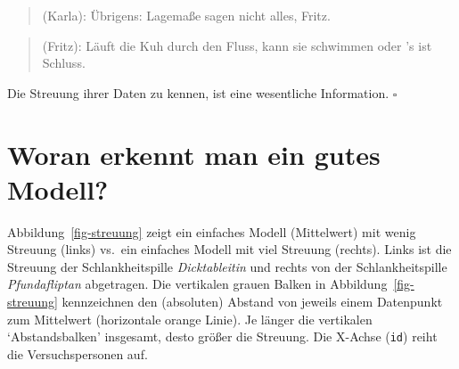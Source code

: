 \documentclass[
  letterpaper,
  twoside,
  open=any]{scrbook}
\theoremstyle{definition}
\theoremstyle{definition}
\theoremstyle{definition}
\theoremstyle{remark}
\begin{document}
\begin{quote}
{} (Karla): Übrigens: Lagemaße sagen nicht alles,
Fritz.
\end{quote}

\begin{quote}
{} (Fritz): Läuft die Kuh durch den Fluss, kann sie
schwimmen oder 's ist Schluss.
\end{quote}

\begin{tcolorbox}[enhanced jigsaw, colbacktitle=quarto-callout-important-color!10!white, colframe=quarto-callout-important-color-frame, coltitle=black, arc=.35mm, breakable, opacitybacktitle=0.6, toprule=.15mm, colback=white, rightrule=.15mm, opacityback=0, toptitle=1mm, title=\textcolor{quarto-callout-important-color}{\faExclamation}\hspace{0.5em}{Wichtig}, titlerule=0mm, bottomtitle=1mm, bottomrule=.15mm, leftrule=.75mm, left=2mm]

Die Streuung ihrer Daten zu kennen, ist eine wesentliche Information.
\(\square\)

\end{tcolorbox}

\section{Woran erkennt man ein gutes
Modell?}\label{woran-erkennt-man-ein-gutes-modell}

Abbildung~\ref{fig-streuung} zeigt ein einfaches Modell (Mittelwert) mit
wenig Streuung (links) vs.~ein einfaches Modell mit viel Streuung
(rechts). Links ist die Streuung der Schlankheitspille
\emph{Dicktableitin} und rechts von der Schlankheitspille
\emph{Pfundafliptan} abgetragen. Die vertikalen grauen Balken in
Abbildung~\ref{fig-streuung} kennzeichnen den (absoluten) Abstand von
jeweils einem Datenpunkt zum Mittelwert (horizontale orange Linie). Je
länger die vertikalen \enquote*{Abstandsbalken} insgesamt, desto größer
die Streuung. Die X-Achse (\texttt{id}) reiht die Versuchspersonen auf.
\end{document}

